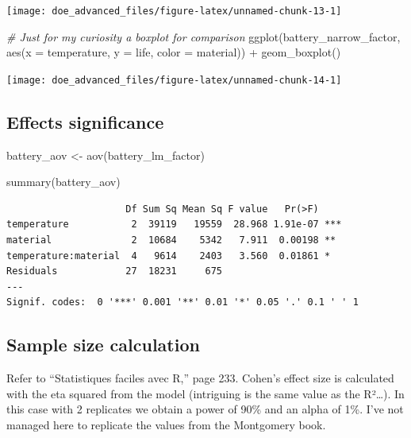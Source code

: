 \documentclass[
]{book}
\newenvironment{Shaded}{\begin{snugshade}}{\end{snugshade}}
\newcommand{\AttributeTok}[1]{\textcolor[rgb]{0.77,0.63,0.00}{#1}}
\newcommand{\CommentTok}[1]{\textcolor[rgb]{0.56,0.35,0.01}{\textit{#1}}}
\newcommand{\FunctionTok}[1]{\textcolor[rgb]{0.00,0.00,0.00}{#1}}
\newcommand{\NormalTok}[1]{#1}
\newcommand{\OtherTok}[1]{\textcolor[rgb]{0.56,0.35,0.01}{#1}}
\newcommand{\SpecialCharTok}[1]{\textcolor[rgb]{0.00,0.00,0.00}{#1}}
\begin{document}
\texttt{[image: doe\_advanced\_files/figure-latex/unnamed-chunk-13-1]}

\begin{Shaded}
\begin{Highlighting}[]
\CommentTok{\# Just for my curiosity a boxplot for comparison}
\FunctionTok{ggplot}\NormalTok{(battery\_narrow\_factor, }\FunctionTok{aes}\NormalTok{(}\AttributeTok{x =}\NormalTok{ temperature, }\AttributeTok{y =}\NormalTok{ life, }\AttributeTok{color =}\NormalTok{ material)) }\SpecialCharTok{+}
  \FunctionTok{geom\_boxplot}\NormalTok{()}
\end{Highlighting}
\end{Shaded}

\texttt{[image: doe\_advanced\_files/figure-latex/unnamed-chunk-14-1]}

\hypertarget{effects-significance}{%
\subsection{Effects significance}\label{effects-significance}}

\begin{Shaded}
\begin{Highlighting}[]
\NormalTok{battery\_aov }\OtherTok{\textless{}{-}} \FunctionTok{aov}\NormalTok{(battery\_lm\_factor)}

\FunctionTok{summary}\NormalTok{(battery\_aov)}
\end{Highlighting}
\end{Shaded}

\begin{verbatim}
                     Df Sum Sq Mean Sq F value   Pr(>F)    
temperature           2  39119   19559  28.968 1.91e-07 ***
material              2  10684    5342   7.911  0.00198 ** 
temperature:material  4   9614    2403   3.560  0.01861 *  
Residuals            27  18231     675                     
---
Signif. codes:  0 '***' 0.001 '**' 0.01 '*' 0.05 '.' 0.1 ' ' 1
\end{verbatim}

\hypertarget{sample-size-calculation}{%
\subsection{Sample size calculation}\label{sample-size-calculation}}

Refer to ``Statistiques faciles avec R,'' page 233.
Cohen's effect size is calculated with the eta squared from the model (intriguing is the same value as the R²\ldots).
In this case with 2 replicates we obtain a power of 90\% and an alpha of 1\%.
I've not managed here to replicate the values from the Montgomery book.
\end{document}
